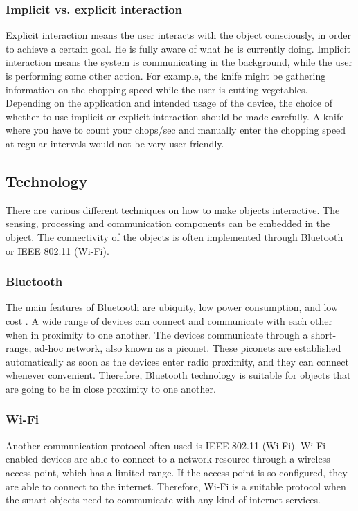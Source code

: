 \subsubsection{Implicit vs. explicit interaction}
Explicit interaction means the user interacts with the object consciously, in order to achieve a certain goal.
He is fully aware of what he is currently doing.
Implicit interaction means the system is communicating in the background, while the user is performing some other action.
For example, the knife might be gathering information on the chopping speed while the user is cutting vegetables. Depending on the application and intended usage of the device, the choice of whether to use implicit or explicit interaction should be made carefully.
A knife where you have to count your chops/sec and manually enter the chopping speed at regular intervals would not be very user friendly.

\subsection{Technology}
\label{sec:techniques}
There are various different techniques on how to make objects interactive. 
The sensing, processing and communication components can be embedded in the object.
The connectivity of the objects is often implemented through Bluetooth \cite{bluetoothPatent} or IEEE 802.11 (Wi-Fi).

\subsubsection{Bluetooth}
The main features of Bluetooth are ubiquity, low power consumption, and low cost \cite{btbasics}.
A wide range of devices can connect and communicate with each other when in proximity to one another.
The devices communicate through a short-range, ad-hoc network, also known as a piconet.
These piconets are established automatically as soon as the devices enter radio proximity, and they can connect whenever convenient.
Therefore, Bluetooth technology is suitable for objects that are going to be in close proximity to one another. 

\subsubsection{Wi-Fi}
Another communication protocol often used is IEEE 802.11 (Wi-Fi).
Wi-Fi enabled devices are able to connect to a network resource through a wireless access point, which has a limited range.
If the access point is so configured, they are able to connect to the internet.
Therefore, Wi-Fi is a suitable protocol when the smart objects need to communicate with any kind of internet services.

